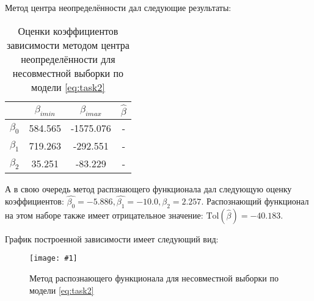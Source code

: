 \documentclass[a4paper,12pt]{article}
\newcommand{\plot}[3]{
    \begin{figure}[H]
        \texttt{[image: \#1]}
        \caption{#2}
        \label{#3}
    \end{figure}
}
\begin{document}
    \noindent Метод центра неопределённости дал следующие результаты:
    \begin{table}[H]
        \begin{center}
            \begin{tabular}{| c | c | c | c |}
                \hline
                & $ \beta_{imin} $ & $ \beta_{imax} $ & $ \hat{\beta} $ \\
                \hline
                $ \beta_{0} $ & 584.565 & -1575.076 & - \\
                \hline
                $ \beta_{1} $ & 719.263 & -292.551 & - \\
                \hline
                $ \beta_{2} $ & 35.251 & -83.229 & - \\
                \hline
            \end{tabular}
        \end{center}
        \caption{Оценки коэффициентов зависимости методом центра неопределённости для несовместной выборки по модели \ref{eq:task2}}
        \label{t:estimdata50}
    \end{table}

    \noindent А в свою очередь метод распзнающего функционала дал следующую оценку коэффициентов:
    $ \hat{\beta_0} = -5.886, \hat{\beta_{1}} = -10.0, \hat{\beta_{2}} = 2.257 $.
    Распознающий функционал на этом наборе также имеет отрицательное значение: $ \text{Tol}(\hat{\beta}) = -40.183 $.

    \noindent График построенной зависимости имеет следующий вид:
    \plot{TolDataWithEstims50}{Метод распознающего функционала для несовместной выборки по модели \ref{eq:task2}}{p:tolestimdata50}
\end{document}
